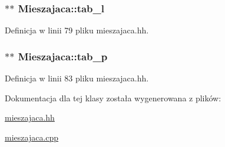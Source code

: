 \hypertarget{class_mieszajaca_adb0f4884ed63b184cf0bd63e757490cd}{
\subsubsection[{tab\-\_\-l}]{$\ast$$\ast$ Mieszajaca\-::tab\-\_\-l\hspace{0.3cm}{\ttfamily [private]}}}\label{class_mieszajaca_adb0f4884ed63b184cf0bd63e757490cd}


Definicja w linii 79 pliku mieszajaca.\-hh.

\hypertarget{class_mieszajaca_a37e86d776d7eeef64b36f04e91b44a4c}{
\subsubsection[{tab\-\_\-p}]{$\ast$$\ast$ Mieszajaca\-::tab\-\_\-p\hspace{0.3cm}{\ttfamily [private]}}}\label{class_mieszajaca_a37e86d776d7eeef64b36f04e91b44a4c}


Definicja w linii 83 pliku mieszajaca.\-hh.



Dokumentacja dla tej klasy została wygenerowana z plików\-:\begin{DoxyCompactItemize}
\item 
\hyperlink{mieszajaca_8hh}{mieszajaca.\-hh}\item 
\hyperlink{mieszajaca_8cpp}{mieszajaca.\-cpp}\end{DoxyCompactItemize}
